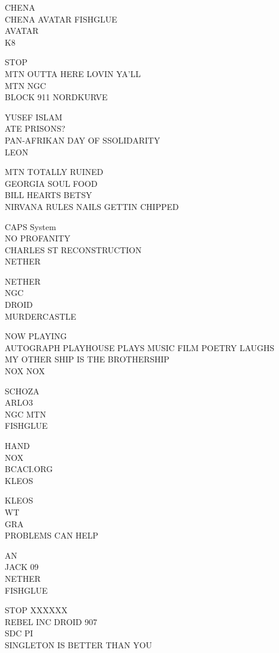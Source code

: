 \documentclass[10pt,letterpaper]{article}
\begin{document}
CHENA\\
CHENA AVATAR FISHGLUE\\
AVATAR\\
K8

STOP\\
MTN OUTTA HERE LOVIN YA'LL\\
MTN NGC\\
BLOCK 911 NORDKURVE

YUSEF ISLAM\\
ATE PRISONS?\\
PAN{-}AFRIKAN DAY OF SSOLIDARITY\\
LEON

MTN TOTALLY RUINED\\
GEORGIA SOUL FOOD\\
BILL HEARTS BETSY\\
NIRVANA RULES NAILS GETTIN CHIPPED

CAPS System\\
NO PROFANITY\\
CHARLES ST RECONSTRUCTION\\
NETHER

NETHER\\
NGC\\
DROID\\
MURDERCASTLE

NOW PLAYING\\
AUTOGRAPH PLAYHOUSE PLAYS MUSIC FILM POETRY LAUGHS\\
MY OTHER SHIP IS THE BROTHERSHIP\\
NOX NOX

SCHOZA\\
ARLO3\\
NGC MTN\\
FISHGLUE

HAND\\
NOX\\
BCACI.ORG\\
KLEOS

KLEOS\\
WT\\
GRA\\
PROBLEMS CAN HELP

AN\\
JACK 09\\
NETHER\\
FISHGLUE

STOP XXXXXX\\
REBEL INC DROID 907\\
SDC PI\\
SINGLETON IS BETTER THAN YOU
\end{document}
